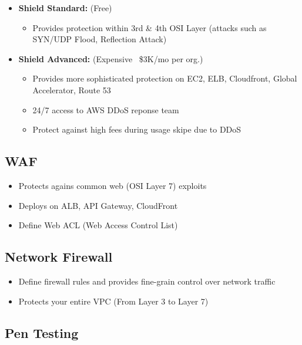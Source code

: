 \begin{itemize}
    \item{\textbf{Shield Standard:}} (Free)
        \begin{itemize}
            \item{Provides protection within 3rd \& 4th OSI Layer (attacks such as SYN/UDP Flood, Reflection Attack)}
        \end{itemize}
    \item{\textbf{Shield Advanced:}} (Expensive ~\$3K/mo per org.)
        \begin{itemize}
            \item{Provides more sophisticated protection on EC2, ELB, Cloudfront, Global Accelerator, Route 53}
            \item{24/7 access to AWS DDoS reponse team}
            \item{Protect against high fees during usage skipe due to DDoS}
        \end{itemize}
\end{itemize}

\subsection{WAF}\label{subsec:waf}

\begin{itemize}
    \item{Protects agains common web (OSI Layer 7) exploits}
    \item{Deploys on ALB, API Gateway, CloudFront}
    \item{Define Web ACL (Web Access Control List)}
\end{itemize}

\subsection{Network Firewall}\label{subsec:network-firewall}

\begin{itemize}
    \item{Define firewall rules and provides fine-grain control over network traffic}
    \item{Protects your entire VPC (From Layer 3 to Layer 7)}
\end{itemize}

\subsection{Pen Testing}\label{subsec:pen-testing}


